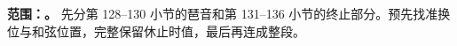 \textbf{范围：\CurrentSegmentRange。} 先分第 128--130 小节的琶音和第 131--136 小节的终止部分。预先找准换位与和弦位置，完整保留休止时值，最后再连成整段。
\SegmentScore
